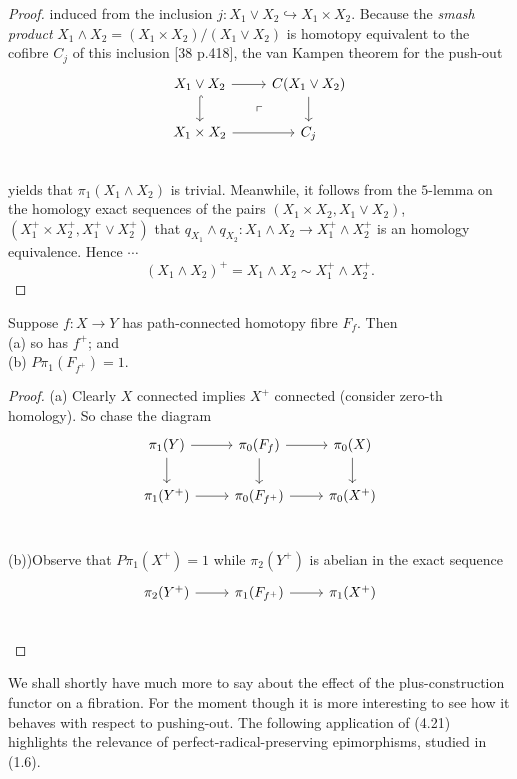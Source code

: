 \begin{proof}
induced from the inclusion $j \colon   X_1\vee X_2 \hookrightarrow X_1\times X_2$. Because the {\em smash product}  $X_1\wedge X_2 = (X_1\times X_2)/(X_1\vee X_2)$ is homotopy equivalent to the cofibre $C_j$ of this inclusion [38 p.418], the van Kampen theorem for the push-out 
\[
\begin{tikzcd}
 X_1\vee X_2 \arrow{r} \arrow[hook]{d} \arrow[dr, phantom, "\ulcorner"] & C(X_1\vee X_2) \arrow{d}\\
 X_1\times X_2 \arrow{r} & C_j\\
 \end{tikzcd}
 \]
yields that $\pi_1(X_1\wedge X_2)$ is trivial. Meanwhile, it follows from the $5$-lemma on the homology exact sequences of the pairs $(X_1\times X_2, X_1\vee X_2)$, $(X_1^+ \times X_2^+ , X_1^+ \vee X_2^+ )$ that $q_{X_1}\wedge q_{X_2}\colon   X_1\wedge X_2 \longrightarrow X_1^+ \wedge X_2^+ $ is an homology equivalence. Hence $\cdots$
\begin{equation}
 	(X_1\wedge X_2)^+ = X_1\wedge X_2 \sim X_1^+ \wedge X_2^+.
 \end{equation} 
\end{proof}
\begin{prop}
	Suppose $f \colon   X\longrightarrow Y$ has path-connected homotopy fibre $F_f$. Then\\
(a) so has $f^+$; and\\
(b) $P\pi_1(F_{f^+})=1$.
\end{prop}
\begin{proof}
(a) Clearly $X$ connected implies $X^+$ connected (consider zero-th homology). So chase the diagram
\[
 \begin{tikzcd}
 \pi_1 (Y) \arrow{r} \arrow{d}& \pi_0(F_{f}) \arrow{r} \arrow{d}&\pi_0(X) \arrow{d} \\
 \pi_1(Y^+) \arrow{r} & \pi_0(F_{f^+})   \arrow{r}              &\pi_0(X^+)  \\
 \end{tikzcd}
 \]

(b))Observe that $P\pi_1(X^+) = 1$ while $\pi_2(Y^+)$ is abelian in the exact sequence
\[
 \begin{tikzcd}
 \pi_2(Y^+) \arrow{r} & \pi_1(F_{f^+})   \arrow{r}              &\pi_1(X^+)  \\
 \end{tikzcd}
 \]

\end{proof}

We shall shortly have much more to say about the effect of the plus-construction functor on a fibration. For the moment though it is more interesting to see how it behaves with respect to
pushing-out. The following application of (4.21) highlights the relevance of perfect-radical-preserving epimorphisms, studied in (1.6).


